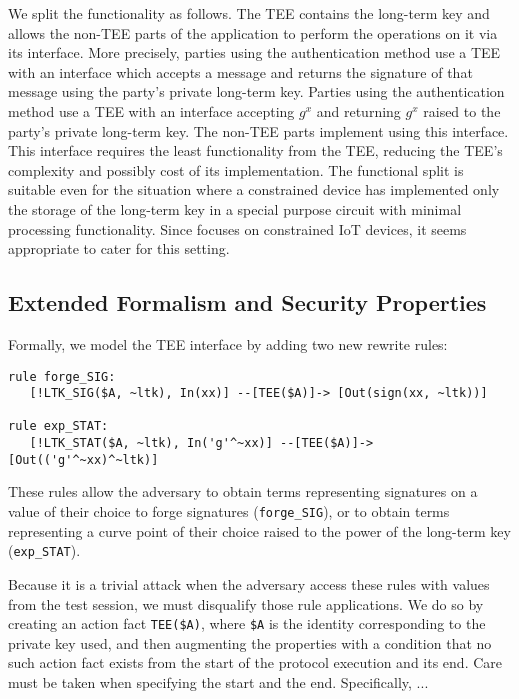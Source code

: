 \documentclass[runningheads]{llncs}
\begin{document}
We split the \mEdhoc{} functionality as follows.
%
The TEE contains the long-term key and allows the non-TEE parts of the
application to perform the operations on it via its interface.
%
More precisely, parties using the \mSig{} authentication method use a TEE with
an interface which accepts a message and returns the signature of that message
using the party's private long-term key.
%
Parties using the \mStat{} authentication method use a TEE with an interface
accepting $g^x$ and returning $g^x$ raised to the party's private long-term key.
%
The non-TEE parts implement \mEdhoc{} using this interface.
%
This interface requires the least functionality from the TEE, reducing the TEE's
complexity and possibly cost of its implementation.
%
The functional split is suitable even for the situation where a
constrained device has implemented only the storage of the long-term key in a
special purpose circuit with minimal processing functionality.
%
Since \mEdhoc{} focuses on constrained IoT devices, it seems appropriate to
cater for this setting.
%

\subsection{Extended Formalism and Security Properties}
\label{sec:TEE:fmAndProps}
Formally, we model the TEE interface by adding two new rewrite rules:
%
\begin{small}
\begin{verbatim}
rule forge_SIG:
   [!LTK_SIG($A, ~ltk), In(xx)] --[TEE($A)]-> [Out(sign(xx, ~ltk))]

rule exp_STAT:
   [!LTK_STAT($A, ~ltk), In('g'^~xx)] --[TEE($A)]-> [Out(('g'^~xx)^~ltk)]
\end{verbatim}
\end{small}
%
These rules allow the adversary to obtain terms representing signatures on a
value of their choice to forge signatures (\verb|forge_SIG|), or to obtain terms
representing a curve point of their choice raised to the power of the
long-term key (\verb|exp_STAT|).
%

Because it is a trivial attack when the adversary access these rules with values
from the test session, we must disqualify those rule applications.
%
We do so by creating an action fact \verb|TEE($A)|, where \verb|$A| is the
identity corresponding to the private key used, and then augmenting the
properties with a condition that no such action fact exists from the start of
the protocol execution and its end.
%
Care must be taken when specifying the start and the end.
%
Specifically, ...
\end{document}
